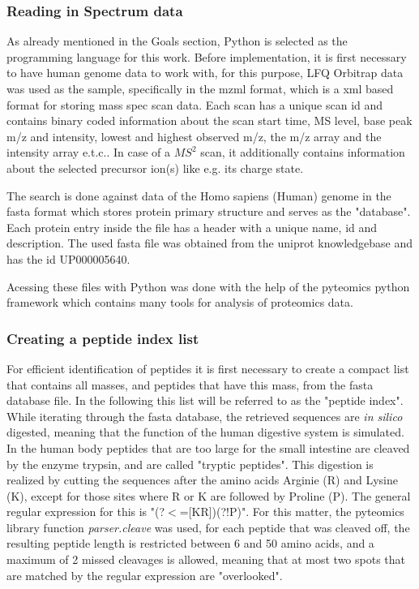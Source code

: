 \documentclass[11pt]{article}
\begin{document}
\subsubsection{Reading in Spectrum data}

As already mentioned in the Goals section, Python is selected as the programming language for this work. Before implementation, it is first necessary to have human genome data to work with, for this purpose, LFQ Orbitrap data was used as the sample, specifically in the mzml format, which is a xml based format for storing mass spec scan data. Each scan has a unique scan id and contains binary coded information about the scan start time, MS level, base peak m/z and intensity, lowest and highest observed m/z, the m/z array and the intensity array e.t.c.. In case of a \(MS^2\) scan, it additionally contains information about the selected precursor ion(s) like e.g. its charge state.

The search is done against data of the Homo sapiens (Human) genome in the fasta format which stores protein primary structure and serves as the "database". Each protein entry inside the file has a header with a unique name, id and description. The used fasta file was obtained from the uniprot knowledgebase and has the id UP000005640.

Acessing these files with Python was done with the help of the pyteomics python framework \cite{pyteomics, pyteomics-five-years} which contains many tools for analysis of proteomics data. 

\subsubsection{Creating a peptide index list}
For efficient identification of peptides it is first necessary to create a compact list that contains all masses, and peptides that have this mass, from the fasta database file. In the following this list will be referred to as the "peptide index". While iterating through the fasta database, the retrieved sequences are \textit{in silico} digested, meaning that the function of the human digestive system is simulated. In the human body peptides that are too large for the small intestine are cleaved by the enzyme trypsin, and are called "tryptic peptides". This digestion is realized by cutting the sequences after the amino acids Arginie (R) and Lysine (K), except for those sites where R or K are followed by Proline (P). The general regular expression for this is "(?$<$=[KR])(?!P)". For this matter, the pyteomics library function \textit{parser.cleave} was used, for each peptide that was cleaved off, the resulting peptide length is restricted between 6 and 50 amino acids, and a maximum of 2 missed cleavages is allowed, meaning that at most two spots that are matched by the regular expression are "overlooked". 
\end{document}
